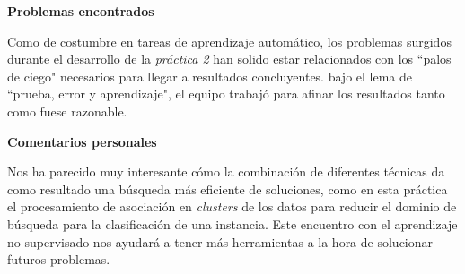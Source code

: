 \documentclass[12pt]{article}
\begin{document}
\vspace{0.5cm}
\centerline{\textbf{Problemas encontrados}}
\vspace{0.5cm}

Como de costumbre en tareas de aprendizaje automático, los problemas surgidos durante el desarrollo de la \emph{práctica 2} han solido estar relacionados con los ``palos de ciego" necesarios para llegar a resultados concluyentes. bajo el lema de ``prueba, error y aprendizaje", el equipo trabajó para afinar los resultados tanto como fuese razonable.

\vspace{0.5cm}
\centerline{\textbf{Comentarios personales}}
\vspace{0.5cm}

Nos ha parecido muy interesante cómo la combinación de diferentes técnicas da como resultado una búsqueda más eficiente de soluciones, como en esta práctica el procesamiento de asociación en \emph{clusters} de los datos para reducir el dominio de búsqueda para la clasificación de una instancia. Este encuentro con el aprendizaje no supervisado nos ayudará a tener más herramientas a la hora de solucionar futuros problemas.
\end{document}
